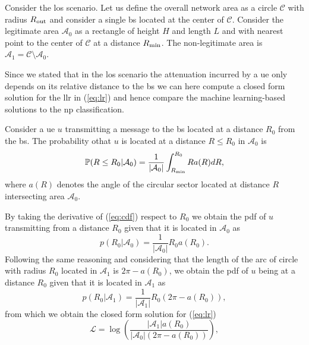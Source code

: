 \documentclass[draftcls,onecolumn,12pt]{IEEEtran}
\begin{document}
Consider the \ac{los} scenario. Let us define the overall network area as a circle $\mathcal{C}$ with radius $R_{\rm out}$ and consider a single \ac{bs} located at the center of $\mathcal{C}$. Consider the legitimate area $\mathcal{A}_{0}$ as a rectangle of height $H$ and length $L$ and with nearest point to the center of $\mathcal{C}$ at a distance $R_{\rm min}$. The non-legitimate area is $\mathcal{A}_1 = \mathcal{C} \setminus \mathcal{A}_0$.

Since we stated that in the \ac{los} scenario the attenuation incurred by a \ac{ue} only depends on its relative distance to the \ac{bs} we can here compute a closed form solution for the \ac{llr} in (\ref{eq:lr}) and hence compare the machine learning-based solutions to the \ac{np} classification.

Consider a \ac{ue} $u$ transmitting a message to the \ac{bs} located at a distance $R_0$ from the \ac{bs}. The probability othat $u$ is located at a distance $R\le R_0$ in $\mathcal{A}_0$ is
\begin{equation}\label{eq:cdf}
     \mathbb{P}(R \le R_0|\mathcal{A}_0) = \frac{1}{|\mathcal{A}_0|}\int_{R_{\rm min}}^{R_0} R a(R) dR,
\end{equation}
where $a(R)$ denotes the angle of the circular sector located at distance $R$ intersecting area $\mathcal{A}_0$.

By taking the derivative of (\ref{eq:cdf}) respect to $R_0$ we obtain the \ac{pdf} of $u$ transmitting from a distance $R_0$ given that it is located in $\mathcal{A}_0$ as
\begin{equation}
    p(R_0|\mathcal{A}_0) = \frac{1}{|\mathcal{A}_0|}R_0a(R_0).
\end{equation}
Following the same reasoning and considering that the length of the arc of circle with radius $R_0$ located in $\mathcal{A}_1$ is $2\pi - a(R_0)$, we obtain the \ac{pdf} of $u$ being at a distance $R_0$ given that it is located in $\mathcal{A}_1$ as
\begin{equation}
     p(R_0|\mathcal{A}_1) = \frac{1}{|\mathcal{A}_1|}R_0\left(2\pi-a(R_0)\right),
\end{equation}
from which we obtain the closed form solution for (\ref{eq:lr}) 
\begin{equation}
    \mathcal{L}=\log\left(\frac{|\mathcal{A}_1|a(R_0)}{|\mathcal{A}_0|\left(2\pi-a(R_0)\right)}\right),
\end{equation}
\end{document}
